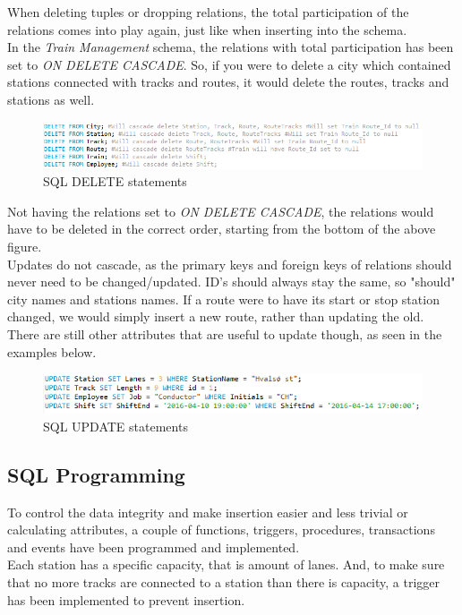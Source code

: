 When deleting tuples or dropping relations, the total participation of the relations comes into play again, just like when inserting into the schema.\\
In the \emph{Train Management} schema, the relations with total participation has been set to \emph{ON DELETE CASCADE}. So, if you were to delete a city which contained stations connected with tracks and routes, it would delete the routes, tracks and stations as well.\\

\begin{figure}[ht!]
    \centering
    \includegraphics[width=1\textwidth]{img/DELETE_Statements}
    \caption{SQL DELETE statements}
    \label{fig:ER}
\end{figure}

Not having the relations set to \emph{ON DELETE CASCADE}, the relations would have to be deleted in the correct order, starting from the bottom of the above figure.
\\[12pt]
Updates do not cascade, as the primary keys and foreign keys of relations should never need to be changed/updated. ID's should always stay the same, so "should" city names and stations names. If a route were to have its start or stop station changed, we would simply insert a new route, rather than updating the old.\\
There are still other attributes that are useful to update though, as seen in the examples below.

\begin{figure}[ht!]
    \centering
    \includegraphics[width=1\textwidth]{img/UPDATE_Statements}
    \caption{SQL UPDATE statements}
    \label{fig:ER}
\end{figure}
\newpage

\subsection{SQL Programming}
To control the data integrity and make insertion easier and less trivial or calculating attributes, a couple of functions, triggers, procedures, transactions and events have been programmed and implemented.
\\[12pt]
Each station has a specific capacity, that is amount of lanes. And, to make sure that no more tracks are connected to a station than there is capacity, a trigger has been implemented to prevent insertion.


